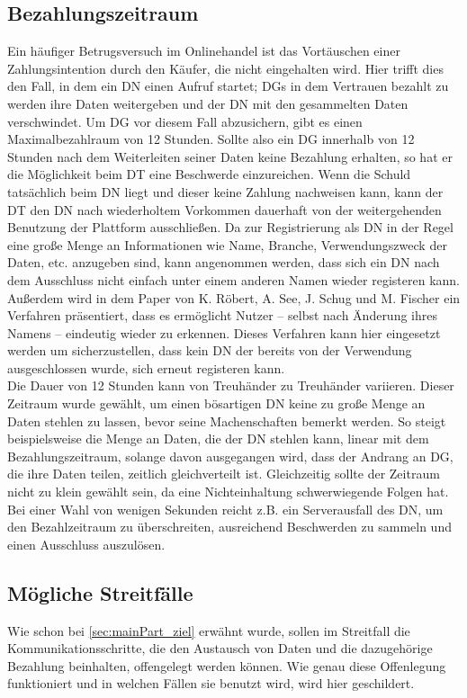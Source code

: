 \documentclass[
	fontsize=11pt,
	headings=small,
	parskip=half,           %
	bibliography=totoc,
	numbers=noenddot,       %
	open=any,               %
]{scrreprt}
\begin{document}
\subsection{Bezahlungszeitraum}
\label{subsec:paymentTimespan}
Ein häufiger Betrugsversuch im Onlinehandel ist das Vortäuschen einer Zahlungsintention durch den Käufer, die nicht eingehalten wird. Hier trifft dies den Fall, in dem ein DN einen Aufruf startet; DGs in dem Vertrauen bezahlt zu werden ihre Daten weitergeben und der DN mit den gesammelten Daten verschwindet. Um DG vor diesem Fall abzusichern, gibt es einen Maximalbezahlraum von 12 Stunden. Sollte also ein DG innerhalb von 12 Stunden nach dem Weiterleiten seiner Daten keine Bezahlung erhalten, so hat er die Möglichkeit beim DT eine Beschwerde einzureichen. Wenn die Schuld tatsächlich beim DN liegt und dieser keine Zahlung nachweisen kann, kann der DT den DN nach wiederholtem Vorkommen dauerhaft von der weitergehenden Benutzung der Plattform ausschließen. Da zur Registrierung als DN in der Regel eine große Menge an Informationen wie Name, Branche, Verwendungszweck der Daten, etc. anzugeben sind, kann angenommen werden, dass sich ein DN nach dem Ausschluss nicht einfach unter einem anderen Namen wieder registeren kann. Außerdem wird in dem Paper \cite{roebert2024unlinkable} von K. Röbert, A. See, J. Schug und M. Fischer ein Verfahren präsentiert, dass es ermöglicht Nutzer -- selbst nach Änderung ihres Namens -- eindeutig wieder zu erkennen. Dieses Verfahren kann hier eingesetzt werden um sicherzustellen, dass kein DN der bereits von der Verwendung ausgeschlossen wurde, sich erneut registeren kann.\\

Die Dauer von 12 Stunden kann von Treuhänder zu Treuhänder variieren. Dieser Zeitraum wurde gewählt, um einen bösartigen DN keine zu große Menge an Daten stehlen zu lassen, bevor seine Machenschaften bemerkt werden. So steigt beispielsweise die Menge an Daten, die der DN stehlen kann, linear mit dem Bezahlungszeitraum, solange davon ausgegangen wird, dass der Andrang an DG, die ihre Daten teilen, zeitlich gleichverteilt ist. Gleichzeitig sollte der Zeitraum nicht zu klein gewählt sein, da eine Nichteinhaltung schwerwiegende Folgen hat. Bei einer Wahl von wenigen Sekunden reicht z.B. ein Serverausfall des DN, um den Bezahlzeitraum zu überschreiten, ausreichend Beschwerden zu sammeln und einen Ausschluss auszulösen.

\subsection{Mögliche Streitfälle}
\label{subsec:payStreit}
Wie schon bei \ref{sec:mainPart_ziel} erwähnt wurde, sollen im Streitfall die Kommunikationsschritte, die den Austausch von Daten und die dazugehörige Bezahlung beinhalten, offengelegt werden können. Wie genau diese Offenlegung funktioniert und in welchen Fällen sie benutzt wird, wird hier geschildert.\\
\end{document}

